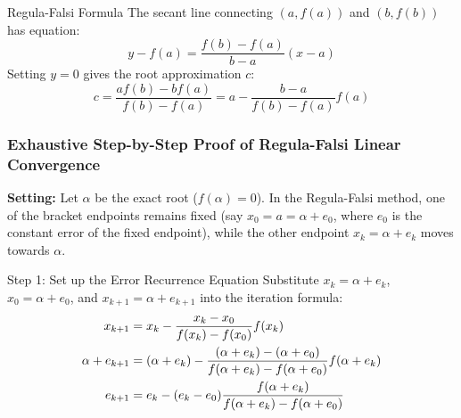 \documentclass[11pt,a4paper]{article}
\begin{document}
\begin{defbox}{Regula-Falsi Formula}
The secant line connecting $(a, f(a))$ and $(b, f(b))$ has equation:
\begin{equation}
    y - f(a) = \frac{f(b) - f(a)}{b - a} (x - a)
\end{equation}
Setting $y = 0$ gives the root approximation $c$:
\begin{equation}
    c = \frac{a f(b) - b f(a)}{f(b) - f(a)} = a - \frac{b - a}{f(b) - f(a)} f(a)
\end{equation}
\end{defbox}

\subsubsection{Exhaustive Step-by-Step Proof of Regula-Falsi Linear Convergence}

\textbf{Setting:} Let $\alpha$ be the exact root ($f(\alpha) = 0$). In the Regula-Falsi method, one of the bracket endpoints remains fixed (say $x_0 = a = \alpha + e_0$, where $e_0$ is the constant error of the fixed endpoint), while the other endpoint $x_k = \alpha + e_k$ moves towards $\alpha$.

\begin{exbox}{Step 1: Set up the Error Recurrence Equation}
Substitute $x_k = \alpha + e_k$, $x_0 = \alpha + e_0$, and $x_{k+1} = \alpha + e_{k+1}$ into the iteration formula:
\begin{align}
    x_{k+1} &= x_k - \frac{x_k - x_0}{f(x_k) - f(x_0)} f(x_k) \notag \\
    \alpha + e_{k+1} &= (\alpha + e_k) - \frac{(\alpha + e_k) - (\alpha + e_0)}{f(\alpha + e_k) - f(\alpha + e_0)} f(\alpha + e_k) \notag \\
    e_{k+1} &= e_k - (e_k - e_0) \frac{f(\alpha + e_k)}{f(\alpha + e_k) - f(\alpha + e_0)}
\end{align}
\end{exbox}
\end{document}
